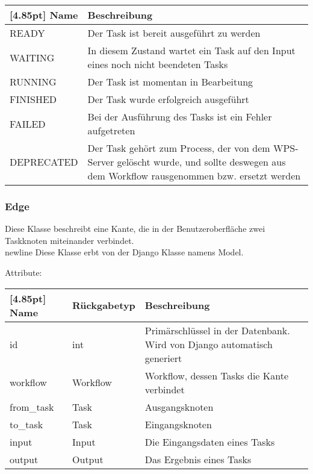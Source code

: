 			\begin{center}
				\renewcommand{\arraystretch}{1.5}
				\setlength\tabcolsep{5pt}
				\begin{tabularx}{\textwidth}{|l|X|}
					\hline
					\rowcolor[gray]{0.75}[4.85pt]
					Name & Beschreibung \\ \hline
					READY & Der Task ist bereit ausgeführt zu werden \\ \hline
					WAITING & In diesem Zustand wartet ein Task auf den Input eines noch nicht beendeten Tasks \\ \hline
					RUNNING & Der Task ist momentan in Bearbeitung \\ \hline
					FINISHED & Der Task wurde erfolgreich ausgeführt \\ \hline
					FAILED & Bei der Ausführung des Tasks ist ein Fehler aufgetreten \\ \hline
					DEPRECATED & Der Task gehört zum Process, der von dem WPS-Server gelöscht wurde, und sollte deswegen aus dem Workflow rausgenommen bzw. ersetzt werden \\ \hline
				\end{tabularx}
			\end{center}
		\subsubsection{Edge}	
				Diese Klasse beschreibt eine Kante, die in der Benutzeroberfläche zwei Taskknoten miteinander verbindet. \\newline
				Diese Klasse erbt von der Django Klasse namens \glqq Model\grqq .\newline
				
				Attribute:
				\begin{center}
					\setlength\tabcolsep{5pt}
					\renewcommand{\arraystretch}{1.5}
					
					\begin{tabularx}{\textwidth}{|l|l|X|}
						\hline
						\rowcolor[gray]{0.75}[4.85pt]
						Name & Rückgabetyp & Beschreibung \\ \hline 
				   		id & int & Primärschlüssel in der Datenbank. Wird von Django automatisch generiert \\ \hline
				   		workflow & Workflow & Workflow, dessen Tasks die Kante verbindet \\ \hline
				   		from\_task & Task & Ausgangsknoten \\ \hline
				   		to\_task & Task & Eingangsknoten \\ \hline
				   		input & Input & Die Eingangsdaten eines Tasks\\ \hline
				   		output & Output & Das Ergebnis eines Tasks \\
				   		
				   		\hline
					\end{tabularx}
				\end{center}

